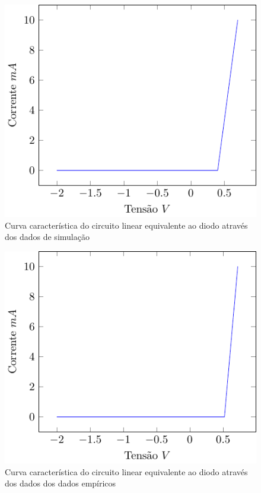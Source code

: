 \documentclass[12pt,a4paper]{article}
\begin{document}
\begin{figure}[htpb]
  \centering
  \includegraphics[width=0.8\linewidth]{simulado_simplificado.pdf}
  \caption{Curva característica do circuito linear equivalente ao diodo através dos dados de simulação }
  \label{fig:simulado_simplificado}
\end{figure}
\begin{figure}[htpb]
  \centering
  \includegraphics[width=0.8\linewidth]{empirico_simplificado.pdf}
  \caption{Curva característica do circuito linear equivalente ao diodo através dos dados dos dados empíricos}
  \label{fig:empirico_simplificado}
\end{figure}
\end{document}
